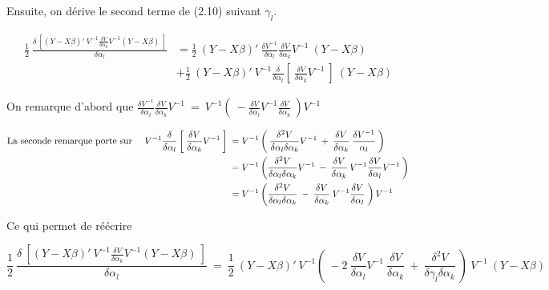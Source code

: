 \documentclass[11pt,fleqn]{book} %
\begin{document}
	\vspace{1em}
	
	Ensuite, on dérive le second terme de (2.10) suivant $\gamma_l$.
	
	\begin{align*}
		\frac{1}{2} \:  \frac{\delta\:\left[ (Y-X\beta)' \:V^{-1} \frac{ \delta V }{\delta \alpha_k} V^{-1} (Y-X\beta)\: \right]  }{\delta \alpha_l} &= \frac{1}{2} \: (Y-X\beta)'\:  \frac{ \delta V^{-1} }{\delta \alpha_l} \frac{ \delta V }{\delta \alpha_k} V^{-1}\:(Y-X\beta)\\
		&+ \frac{1}{2} \: (Y-X\beta)'\:V^{-1} \frac{\delta}{\delta \alpha_l}\left[\:\frac{ \delta V }{\delta \alpha_k} V^{-1}\:\right]\:(Y-X\beta)
	\end{align*}
	
	\vspace{1em}
	
	On remarque d'abord que \quad $\frac{ \delta V^{-1} }{\delta \alpha_l} \frac{ \delta V }{\delta \alpha_k} V^{-1}\:=\:
	V^{-1}  \left(\: - \frac{ \delta V }{\delta \alpha_l} V^{-1} \frac{ \delta V }{\delta \alpha_k}  \:\right) V^{-1}$
	
	\vspace{1em}
	
	\begin{align*}
		\textnormal{La seconde remarque porte sur } \quad V^{-1}\frac{\delta}{\delta \alpha_l}\left[\:\frac{ \delta V }{\delta \alpha_k} V^{-1}\:\right] \:&= V^{-1}\left(\: \frac{ \delta^2 V }{\delta \alpha_l \delta \alpha_k} V^{-1} \:+\:  \frac{ \delta V }{\delta \alpha_k} \:  \frac{\delta V^{-1}}{\alpha_l}\:\right)\\
		&=V^{-1}\left(\frac{ \delta^2 V }{\delta \alpha_l \delta \alpha_k} V^{-1} \:-\:  \frac{ \delta V }{\delta \alpha_k} \:  V^{-1} \frac{ \delta V }{\delta \alpha_l} V^{-1}\:\right) \\
		&=V^{-1}\left(\frac{ \delta^2 V }{\delta \alpha_l \delta \alpha_k} \:-\:  \frac{ \delta V }{\delta \alpha_k} \:  V^{-1} \frac{ \delta V }{\delta \alpha_l} \:\right) V^{-1} \\
	\end{align*}
	
	Ce qui permet de réécrire 
	
	
	\begin{equation*}
		\frac{1}{2} \:  \frac{\delta\:\left[ (Y-X\beta)' \:V^{-1} \frac{ \delta V }{\delta \alpha_k} V^{-1} (Y-X\beta)\: \right]  }{\delta \alpha_l} \:=\: \frac{1}{2} \: (Y-X\beta)'\:V^{-1} \left(\: -2\: \frac{ \delta V }{\delta \alpha_l} V^{-1}\:  \frac{ \delta V }{\delta \alpha_k} \:+\: \frac{ \delta^2 V }{\delta \gamma_l \delta \alpha_k} \:\right)\: V^{-1}\:(Y-X\beta)
	\end{equation*}
	
\end{document}
